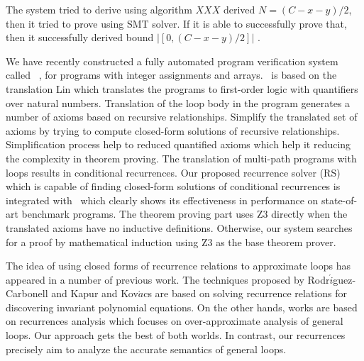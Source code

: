 The system tried to derive using algorithm $XXX$ derived $N=(C-x-y)/2$, then it tried to prove using SMT solver. If it is able to successfully prove that, then it successfully derived bound $ |[0, (C-x-y)/2]|$ .





We have recently constructed a fully automated program verification
system called \SystemName\ \cite{DBLP:conf/synasc/pritom17,viap-array}, for programs with integer assignments and arrays. \SystemName\ is based on the translation Lin \cite{Lin20161} which translates the programs to first-order logic with quantifiers over natural numbers. Translation of the loop body in the program generates a number of axioms based on recursive relationships. Simplify the translated set of axioms by
trying to compute closed-form solutions of recursive relationships. Simplification process help to reduced quantified axioms which help it reducing the complexity in theorem proving. The translation of multi-path programs with loops results in conditional recurrences. Our proposed recurrence solver (RS) which is capable of finding closed-form solutions of conditional recurrences is integrated with \SystemName\ which clearly shows its effectiveness in performance on state-of-art benchmark programs. The theorem proving part uses Z3 directly when the translated axioms have no inductive definitions.
Otherwise, our system searches for a proof by mathematical induction using
Z3 as the base theorem prover. 

The idea of using closed forms of recurrence relations to approximate loops has appeared in a number of previous work. The techniques proposed by Rodr$\acute{i}$guez-Carbonell and Kapur \cite{rodriguez2004automatic} and Kov$\acute{a}$cs\cite{kovacs2004} are based on solving recurrence relations for discovering invariant polynomial equations. On the other hands, works \cite{farzan2015compositional,kincaid2017compositional,kincaid2017non} are based on recurrences analysis which focuses on over-approximate analysis of general loops. Our approach gets the best of both worlds. In contrast, our recurrences precisely
aim to analyze the accurate semantics of general loops.



